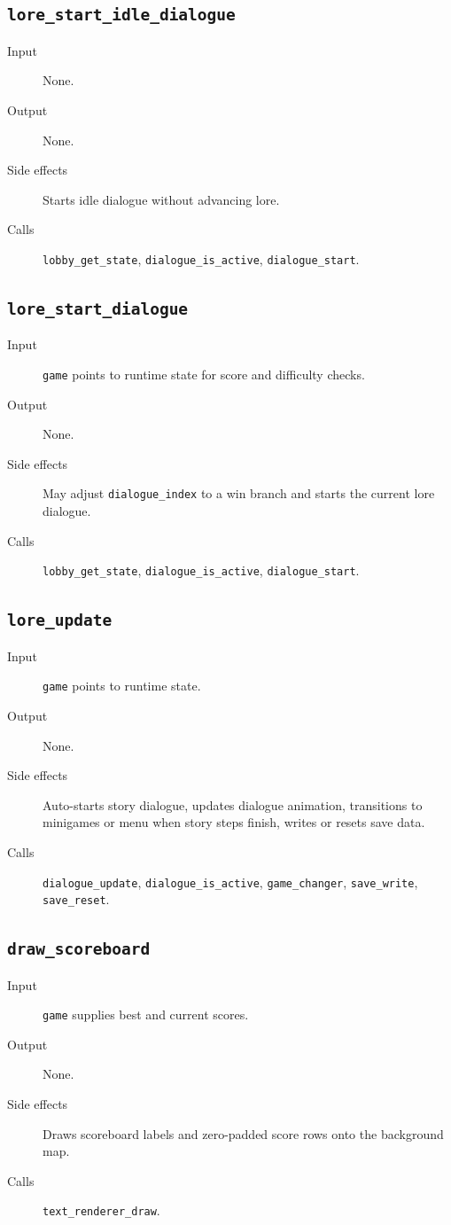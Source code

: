\subsection*{\texttt{lore\_start\_idle\_dialogue}}
\begin{description}
  \item[Input] None.
  \item[Output] None.
  \item[Side effects] Starts idle dialogue without advancing lore.
  \item[Calls] \texttt{lobby\_get\_state}, \texttt{dialogue\_is\_active}, \texttt{dialogue\_start}.
\end{description}

\subsection*{\texttt{lore\_start\_dialogue}}
\begin{description}
  \item[Input] \texttt{game} points to runtime state for score and difficulty checks.
  \item[Output] None.
  \item[Side effects] May adjust \texttt{dialogue\_index} to a win branch and starts the current lore dialogue.
  \item[Calls] \texttt{lobby\_get\_state}, \texttt{dialogue\_is\_active}, \texttt{dialogue\_start}.
\end{description}

\subsection*{\texttt{lore\_update}}
\begin{description}
  \item[Input] \texttt{game} points to runtime state.
  \item[Output] None.
  \item[Side effects] Auto-starts story dialogue, updates dialogue animation, transitions to minigames or menu when story steps finish, writes or resets save data.
  \item[Calls] \texttt{dialogue\_update}, \texttt{dialogue\_is\_active}, \texttt{game\_changer}, \texttt{save\_write}, \texttt{save\_reset}.
\end{description}

\subsection*{\texttt{draw\_scoreboard}}
\begin{description}
  \item[Input] \texttt{game} supplies best and current scores.
  \item[Output] None.
  \item[Side effects] Draws scoreboard labels and zero-padded score rows onto the background map.
  \item[Calls] \texttt{text\_renderer\_draw}.
\end{description}

